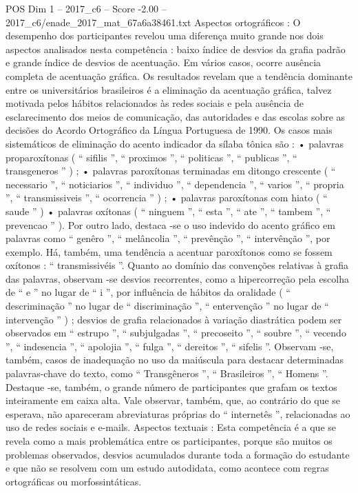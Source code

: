 \begin{textsample}{POS Dim 1 – 2017\_c6 – Score -2.00 – 2017\_c6/enade\_2017\_mat\_67a6a38461.txt}
Aspectos ortográficos : O desempenho dos participantes revelou uma diferença muito grande nos dois aspectos analisados nesta competência : baixo índice de desvios da grafia padrão e grande índice de desvios de acentuação.
Em vários casos, ocorre ausência completa de acentuação gráfica.
Os resultados revelam que a tendência dominante entre os universitários brasileiros é a eliminação da acentuação gráfica, talvez motivada pelos hábitos relacionados às redes sociais e pela ausência de esclarecimento dos meios de comunicação, das autoridades e das escolas sobre as decisões do Acordo Ortográfico da Língua Portuguesa de 1990.
Os casos mais sistemáticos de eliminação do acento indicador da sílaba tônica são : • palavras proparoxítonas ( “ sifilis ”, “ proximos ”, “ politicas ”, “ publicas ”, “ transgeneros ” ) ; • palavras paroxítonas terminadas em ditongo crescente ( “ necessario ”, “ noticiarios ”, “ individuo ”, “ dependencia ”, “ varios ”, “ propria ”, “ transmissiveis ”, “ ocorrencia ” ) ; • palavras paroxítonas com hiato ( “ saude ” ) • palavras oxítonas ( “ ninguem ”, “ esta ”, “ ate ”, “ tambem ”, “ prevencao ” ).
Por outro lado, destaca -se o uso indevido do acento gráfico em palavras como “ genêro ”, “ melâncolia ”, “ prevênção ”, “ intervênção ”, por exemplo.
Há, também, uma tendência a acentuar paroxítonos como se fossem oxítonos : “ transmissivéis ”.
Quanto ao domínio das convenções relativas à grafia das palavras, observam -se desvios recorrentes, como a hipercorreção pela escolha de “ e ” no lugar de “ i ”, por influência de hábitos da oralidade ( “ descriminação ” no lugar de “ discriminação ”, “ entervenção ” no lugar de “ intervenção ” ) ; desvios de grafia relacionados à variação diastrática podem ser observados em “ estrupo ”, “ subjulgadas ”, “ precoseito ”, “ soubre ”, “ vecendo ”, “ indesencia ”, “ apolojia ”, “ fulga ”, “ dereitos ”, “ sifelis ”.
Observam -se, também, casos de inadequação no uso da maiúscula para destacar determinadas palavras-chave do texto, como “ Transgêneros ”, “ Brasileiros ”, “ Homens ”.
Destaque -se, também, o grande número de participantes que grafam os textos inteiramente em caixa alta.
Vale observar, também, que, ao contrário do que se esperava, não apareceram abreviaturas próprias do “ internetês ”, relacionadas ao uso de redes sociais e e-mails.
Aspectos textuais : Esta competência é a que se revela como a mais problemática entre os participantes, porque são muitos os problemas observados, desvios acumulados durante toda a formação do estudante e que não se resolvem com um estudo autodidata, como acontece com regras ortográficas ou morfossintáticas.

\end{textsample}
